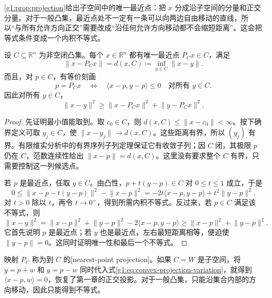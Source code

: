 \cref{g1:prop:projection}给出子空间中的唯一最近点：把 \(x\) 分成沿子空间的分量和正交分量。对于一般凸集，最近点处不一定有一条可以向两边自由移动的直线，所以“与所有允许方向正交”需要改成“沿任何允许方向移动都不会缩短距离”。这会把等式条件变成一个内积不等式。

\begin{theorem}\label{g1:thm:convex-projection}
	设 \(C\subseteq\mathbb R^n\) 为非空闭凸集。每个 \(x\in\mathbb R^n\) 都有唯一最近点 \(P_Cx\in C\)，满足
	\[
		\lVert x-P_Cx\rVert=d(x,C)\coloneqq\inf_{y\in C}\lVert x-y\rVert.
	\]
	而且，对 \(p\in C\)，有等价刻画
	\begin{equation}\label{g1:eq:convex-projection-variation}
		p=P_Cx\quad\Longleftrightarrow\quad
		\langle x-p,y-p\rangle\leq0\quad\text{对所有 }y\in C.
	\end{equation}
	因此对所有 \(y\in C\)，
	\begin{equation}\label{g1:eq:convex-projection-distance}
		\lVert x-y\rVert^2\geq\lVert x-P_Cx\rVert^2+\lVert y-P_Cx\rVert^2.
	\end{equation}
\end{theorem}
\begin{proof}
	先证明最小值能取到。取 \(c_0\in C\)，则 \(d(x,C)\leq\lVert x-c_0\rVert<\infty\)。按下确界定义可取 \(y_j\in C\)，使 \(\lVert x-y_j\rVert\to d(x,C)\)。这些距离有界，所以 \((y_j)\) 有界。有限维实分析中的有界序列子列定理保证它有收敛子列；因 \(C\) 闭，其极限 \(p\) 仍在 \(C\)，范数连续性给出 \(\lVert x-p\rVert=d(x,C)\)。这里没有要求整个 \(C\) 有界，只需要控制这一列候选点。

	若 \(p\) 是最近点，任取 \(y\in C\)。由凸性，\(p+t(y-p)\in C\) 对 \(0\leq t\leq1\) 成立，于是
	\[
		0\leq\lVert x-p-t(y-p)\rVert^2-\lVert x-p\rVert^2
		=-2t\langle x-p,y-p\rangle+t^2\lVert y-p\rVert^2.
	\]
	对 \(t>0\) 除以 \(t\)，再令 \(t\to0^+\)，得到所需内积不等式。反过来，若 \(p\in C\) 满足该不等式，则
	\[
		\lVert x-y\rVert^2
		=\lVert x-p\rVert^2+\lVert y-p\rVert^2-2\langle x-p,y-p\rangle
		\geq\lVert x-p\rVert^2+\lVert y-p\rVert^2.
	\]
	它首先说明 \(p\) 是最近点；若 \(y\) 也是最近点，左右最短距离相等，便迫使 \(\lVert y-p\rVert=0\)。这同时证明唯一性和最后一个不等式。
\end{proof}

映射 \(P_C\) 称为到 \(C\) 的[nearest-point projection]。如果 \(C=W\) 是子空间，将 \(y=p+w\) 和 \(y=p-w\) 同时代入式\eqref{g1:eq:convex-projection-variation}，就得到 \(\langle x-p,w\rangle=0\)，恢复了第一章的正交投影。对于一般凸集，只能沿集合内部的方向移动，因此只能得到不等式。

